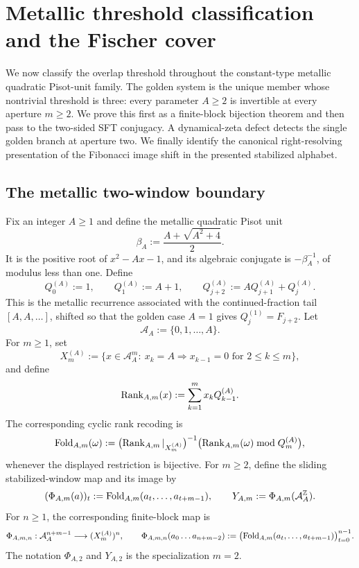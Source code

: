 \section{Metallic threshold classification and the Fischer cover}\label{sec:metallic-cover}

We now classify the overlap threshold throughout the constant-type metallic
quadratic Pisot-unit family.  The golden system is the unique member whose
nontrivial threshold is three: every parameter $A\ge2$ is invertible at every
aperture $m\ge2$.  We prove this first as a finite-block bijection theorem and
then pass to the two-sided SFT conjugacy.  A dynamical-zeta defect detects the
single golden branch at aperture two.  We finally identify the canonical
right-resolving presentation of the Fibonacci image shift in the presented
stabilized alphabet.

\subsection{The metallic two-window boundary}

\begin{definition}\label{def:metallic-window-data}
Fix an integer $A\ge 1$ and define the metallic quadratic Pisot unit
\[
\beta_A:=\frac{A+\sqrt{A^2+4}}2.
\]
It is the positive root of $x^2-Ax-1$, and its algebraic conjugate is
$-\beta_A^{-1}$, of modulus less than one.  Define
\[
Q_0^{(A)}:=1,\qquad Q_1^{(A)}:=A+1,\qquad
Q_{j+2}^{(A)}:=A Q_{j+1}^{(A)}+Q_j^{(A)}.
\]
This is the metallic recurrence associated with the continued-fraction tail
$[A,A,\ldots]$, shifted so that the golden case $A=1$ gives
$Q_j^{(1)}=F_{j+2}$.
Let
\[
\mathcal A_A:=\{0,1,\ldots,A\}.
\]
For $m\ge 1$, set
\[
X_m^{(A)}
:=
\{x\in \mathcal A_A^m:\ x_k=A\Rightarrow x_{k-1}=0
\text{ for }2\le k\le m\},
\]
and define
\[
\operatorname{Rank}_{A,m}(x):=\sum_{k=1}^m x_k Q_{k-1}^{(A)}.
\]
The corresponding cyclic rank recoding is
\[
\mathrm{Fold}_{A,m}(\omega)
:=
\bigl(\operatorname{Rank}_{A,m}|_{X_m^{(A)}}\bigr)^{-1}
\bigl(\operatorname{Rank}_{A,m}(\omega)\bmod Q_m^{(A)}\bigr),
\]
whenever the displayed restriction is bijective. For $m\ge2$, define the
sliding stabilized-window map and its image by
\[
(\Phi_{A,m}(a))_t:=\mathrm{Fold}_{A,m}(a_t,\ldots,a_{t+m-1}),
\qquad
Y_{A,m}:=\Phi_{A,m}(\mathcal A_A^{\mathbb Z}).
\]
For $n\ge1$, the corresponding finite-block map is
\[
\Phi_{A,m,n}:\mathcal A_A^{n+m-1}\longrightarrow (X_m^{(A)})^n,
\qquad
\Phi_{A,m,n}(a_0\ldots a_{n+m-2})
:=\bigl(\mathrm{Fold}_{A,m}(a_t,\ldots,a_{t+m-1})\bigr)_{t=0}^{n-1}.
\]
The notation $\Phi_{A,2}$ and $Y_{A,2}$ is the specialization $m=2$.
\end{definition}

